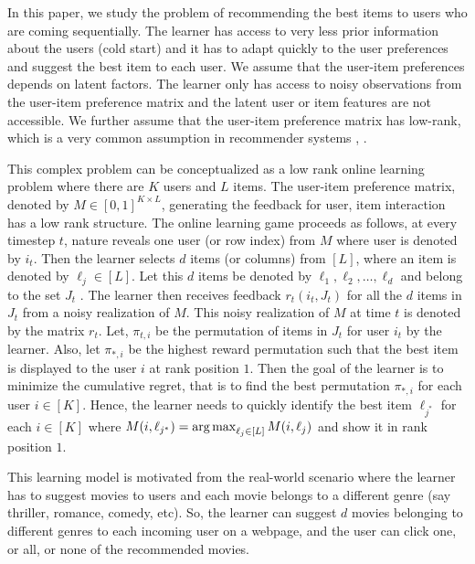 In this paper, we study the problem of recommending the best items to users who are coming sequentially. The learner has access to very less prior information about the users (cold start) and it has to adapt quickly to the user preferences and suggest the best item to each user. We assume that the user-item preferences depends on latent factors. The learner only has access to noisy observations from the user-item preference matrix and the latent user or item features are not accessible. We further assume that the user-item preference matrix has low-rank, which is a very common assumption in recommender systems \citep{koren2009matrix}, \citep{ricci2011liorrokach}. %

	This complex problem can be conceptualized as a low rank online learning  problem where there are $K$ users and $L$ items. The user-item preference  matrix, denoted by $M\in [0,1]^{K\times L}$,  generating the feedback for user, item interaction has a low rank structure. The online learning game proceeds as follows, at every timestep $t$,  nature reveals one user (or row index) from $M$ where user is denoted by $i_t$. Then the learner selects $d$ items (or columns) from $[L]$, where an item is denoted by $\ell _{j}\in [L]$. Let this $d$ items be denoted by $ \ell_{1}, \ell_2, \dots, \ell_d$ and belong to the set $J_t$ . The learner then receives feedback $r_{t}(i_t,J_t)$ for all the $d$ items in $J_t$ from a noisy realization of $M$. This noisy realization of $M$ at time $t$ is denoted by the matrix ${r}_t$. Let, $\pi_{t, i}$ be the permutation of items in $J_t$ for user $i_t$ by the learner. Also, let $\pi_{*, i}$ be the highest reward permutation such that the best item is  displayed to the user $i$ at rank position $1$. Then the goal of the learner is to minimize the cumulative regret, that is to find the best permutation $\pi_{*, i}$ for each user $i\in[K]$. Hence, the learner needs to quickly identify the best item $\ell_{j^*}$ for each $i\in [K]$ where $M(i,\ell_{j^*}) = \mathop{\rm arg\,max} _{\ell_j\in[L]} M(i,\ell_j)$ and show it in rank position $1$. 
	

	This learning model is motivated from the real-world scenario where the learner has  to suggest movies to users and each movie belongs to a different genre (say thriller, romance, comedy, etc). So, the learner can suggest $d$ movies belonging to different genres to each incoming user on a webpage, and the user can click one, or all, or none of the recommended movies. 
	
%	
	
